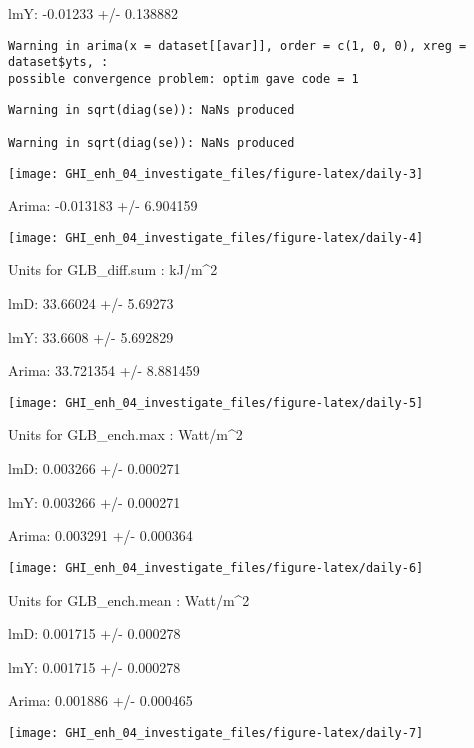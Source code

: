 \documentclass[
  10pt,
  a4paper,oneside]{article}
\begin{document}
lmY: -0.01233 +/- 0.138882

\begin{verbatim}
Warning in arima(x = dataset[[avar]], order = c(1, 0, 0), xreg = dataset$yts, :
possible convergence problem: optim gave code = 1
\end{verbatim}

\begin{verbatim}
Warning in sqrt(diag(se)): NaNs produced

Warning in sqrt(diag(se)): NaNs produced
\end{verbatim}

\begin{center}\texttt{[image: GHI\_enh\_04\_investigate\_files/figure-latex/daily-3]} \end{center}

Arima: -0.013183 +/- 6.904159

\begin{center}\texttt{[image: GHI\_enh\_04\_investigate\_files/figure-latex/daily-4]} \end{center}

Units for GLB\_diff.sum : kJ/m\^{}2

lmD: 33.66024 +/- 5.69273

lmY: 33.6608 +/- 5.692829

Arima: 33.721354 +/- 8.881459

\begin{center}\texttt{[image: GHI\_enh\_04\_investigate\_files/figure-latex/daily-5]} \end{center}

Units for GLB\_ench.max : Watt/m\^{}2

lmD: 0.003266 +/- 0.000271

lmY: 0.003266 +/- 0.000271

Arima: 0.003291 +/- 0.000364

\begin{center}\texttt{[image: GHI\_enh\_04\_investigate\_files/figure-latex/daily-6]} \end{center}

Units for GLB\_ench.mean : Watt/m\^{}2

lmD: 0.001715 +/- 0.000278

lmY: 0.001715 +/- 0.000278

Arima: 0.001886 +/- 0.000465

\begin{center}\texttt{[image: GHI\_enh\_04\_investigate\_files/figure-latex/daily-7]} \end{center}
\end{document}
